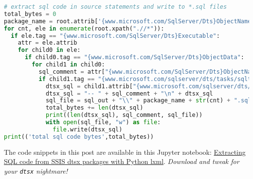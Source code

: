 \begin{lstlisting}[language=python, frame=single, framerule=0pt, label=lst:scr5673X5, basicstyle=\ttfamily\scriptsize]
# extract sql code in source statements and write to *.sql files 
total_bytes = 0
package_name = root.attrib['{www.microsoft.com/SqlServer/Dts}ObjectName'].replace(" ","")
for cnt, ele in enumerate(root.xpath(".//*")):
  if ele.tag == "{www.microsoft.com/SqlServer/Dts}Executable":
    attr = ele.attrib
    for child0 in ele:
      if child0.tag == "{www.microsoft.com/SqlServer/Dts}ObjectData":
        for child1 in child0:
          sql_comment = attr["{www.microsoft.com/SqlServer/Dts}ObjectName"].strip()
          if child1.tag == "{www.microsoft.com/sqlserver/dts/tasks/sqltask}SqlTaskData":
            dtsx_sql = child1.attrib["{www.microsoft.com/sqlserver/dts/tasks/sqltask}SqlStatementSource"]
            dtsx_sql = "-- " + sql_comment + "\n" + dtsx_sql
            sql_file = sql_out + "\\" + package_name + str(cnt) + ".sql"
            total_bytes += len(dtsx_sql)
            print((len(dtsx_sql), sql_comment, sql_file))
            with open(sql_file, "w") as file:
              file.write(dtsx_sql)
print(('total sql code bytes',total_bytes))
\end{lstlisting}


The code snippets in this post are available in this Jupyter notebook:
\href{https://github.com/bakerjd99/jacks/blob/master/notebooks/Extracting\%20SQL\%20code\%20from\%20SSIS\%20dtsx\%20packages\%20with\%20Python\%20lxml.ipynb}{Extracting
SQL code from SSIS dtsx packages with Python lxml}. \emph{Download and tweak
for your \texttt{dtsx} nightmare!}

%
%
%
%
%



%
